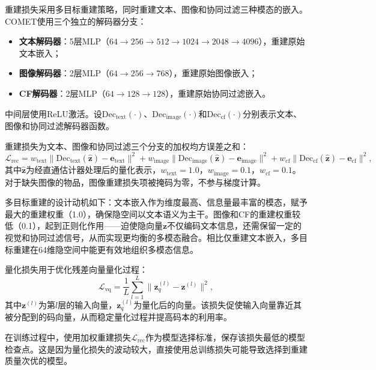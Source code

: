 重建损失采用多目标重建策略，同时重建文本、图像和协同过滤三种模态的嵌入。COMET使用三个独立的解码器分支：

\begin{itemize}
  \item \textbf{文本解码器}：5层MLP（$64 \to 256 \to 512 \to 1024 \to 2048 \to 4096$），重建原始文本嵌入；
  \item \textbf{图像解码器}：2层MLP（$64 \to 256 \to 768$），重建原始图像嵌入；
  \item \textbf{CF解码器}：2层MLP（$64 \to 128 \to 128$），重建原始协同过滤嵌入。
\end{itemize}
中间层使用ReLU激活。设$\text{Dec}_{\text{text}}(\cdot)$、$\text{Dec}_{\text{image}}(\cdot)$和$\text{Dec}_{\text{cf}}(\cdot)$分别表示文本、图像和协同过滤解码器函数。

重建损失为文本、图像和协同过滤三个分支的加权均方误差之和：
\begin{equation}
  \mathcal{L}_{\text{rec}} = w_{\text{text}} \|\text{Dec}_{\text{text}}(\hat{\mathbf{z}}) - \mathbf{e}_{\text{text}}\|^2 + w_{\text{image}} \|\text{Dec}_{\text{image}}(\hat{\mathbf{z}}) - \mathbf{e}_{\text{image}}\|^2 + w_{\text{cf}} \|\text{Dec}_{\text{cf}}(\hat{\mathbf{z}}) - \mathbf{e}_{\text{cf}}\|^2,
\end{equation}
其中$\hat{\mathbf{z}}$为经直通估计器处理后的量化表示，$w_{\text{text}} = 1.0$，$w_{\text{image}} = 0.1$，$w_{\text{cf}} = 0.1$。对于缺失图像的物品，图像重建损失项被掩码为零，不参与梯度计算。

多目标重建的设计动机如下：文本嵌入作为维度最高、信息量最丰富的模态，赋予最大的重建权重（1.0），确保隐空间以文本语义为主干。图像和CF的重建权重较低（0.1），起到正则化作用——迫使隐向量$\mathbf{z}$不仅编码文本信息，还需保留一定的视觉和协同过滤信号，从而实现更均衡的多模态融合。相比仅重建文本嵌入，多目标重建在64维隐空间中能更有效地组织多模态信息。

量化损失用于优化残差向量量化过程：
\begin{equation}
  \mathcal{L}_{\text{vq}} = \frac{1}{L} \sum_{l=1}^{L} \|\mathbf{z}_q^{(l)} - \mathbf{z}^{(l)}\|^2,
\end{equation}
其中$\mathbf{z}^{(l)}$为第$l$层的输入向量，$\mathbf{z}_q^{(l)}$为量化后的向量。该损失促使输入向量靠近其被分配到的码向量，从而稳定量化过程并提高码本的利用率。

在训练过程中，使用加权重建损失$\mathcal{L}_{\text{rec}}$作为模型选择标准，保存该损失最低的模型检查点。这是因为量化损失的波动较大，直接使用总训练损失可能导致选择到重建质量次优的模型。

